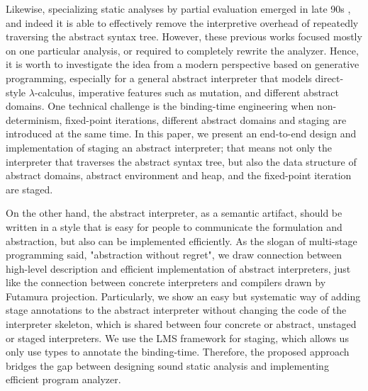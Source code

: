 \iffalse
Likewise, specializing static analyses by partial evaluation emerged in late 90s
, and indeed it is able to effectively remove the interpretive
overhead of repeatedly traversing the abstract syntax tree. However, these
previous works focused mostly on one particular analysis, or required to
completely rewrite the analyzer. Hence, it is worth to investigate the idea from
a modern perspective based on generative programming, especially for a general
abstract interpreter that models direct-style $\lambda$-calculus, imperative
features such as mutation, and different abstract domains. One technical
challenge is the binding-time engineering when non-determinism, fixed-point
iterations, different abstract domains and staging are introduced at the same
time. In this paper, we present an end-to-end design and implementation of
staging an abstract interpreter; that means not only the interpreter that
traverses the abstract syntax tree, but also the data structure of abstract
domains, abstract environment and heap, and the fixed-point iteration are
staged.

On the other hand, the abstract interpreter, as a semantic artifact, should be
written in a style that is easy for people to communicate the formulation and
abstraction, but also can be implemented efficiently. As the slogan of
multi-stage programming said, "abstraction without regret", we draw connection
between high-level description and efficient implementation of abstract
interpreters, just like the connection between concrete interpreters and
compilers drawn by Futamura projection. Particularly, we show an easy but
systematic way of adding stage annotations to the abstract interpreter without
changing the code of the interpreter skeleton, which is shared between four concrete
or abstract, unstaged or staged interpreters. We use the LMS framework for staging,
which allows us only use types to annotate the binding-time. Therefore, the
proposed approach bridges the gap between designing sound static analysis and
implementing efficient program analyzer.


